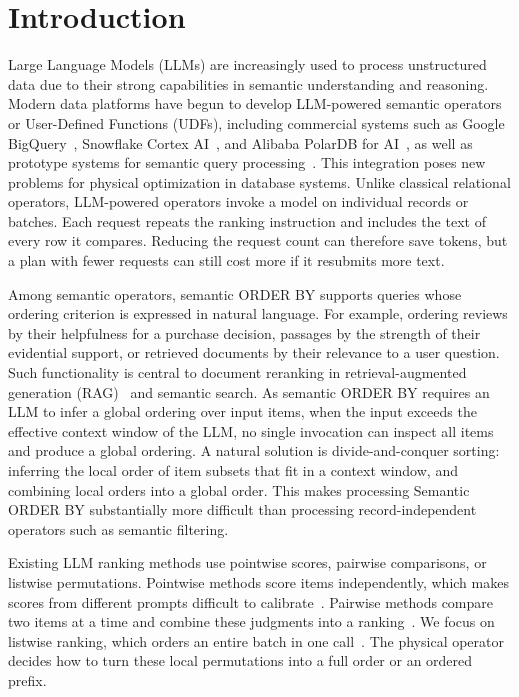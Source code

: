 \section{Introduction}

Large Language Models (LLMs) are increasingly used to process unstructured data due to their strong capabilities in semantic understanding and reasoning.
Modern data platforms have begun to develop LLM-powered semantic operators or User-Defined Functions (UDFs), including commercial systems such as Google BigQuery~\cite{google2026bigqueryai}, Snowflake Cortex AI~\cite{snowflake2026cortexai}, and Alibaba PolarDB for AI~\cite{alibaba2026polardbai}, as well as prototype systems for semantic query processing~\cite{DBLP:journals/pvldb/PatelJPGAGZ25}.
This integration poses new problems for physical optimization in database systems. 
Unlike classical relational operators, LLM-powered operators invoke a model on individual records or batches. Each request repeats the ranking instruction and includes the text of every row it compares. Reducing the request count can therefore save tokens, but a plan with fewer requests can still cost more if it resubmits more text.

Among semantic operators, semantic \textsf{ORDER BY} supports queries whose ordering criterion is expressed in natural language.
For example, ordering reviews by their helpfulness for a purchase decision, passages by the strength of their evidential support, or retrieved documents by their relevance to a user question. 
Such functionality is central to document reranking in retrieval-augmented generation (RAG)~\cite{DBLP:conf/nips/YuP0WYZSC24} and semantic search. As semantic \textsf{ORDER BY} requires an LLM to infer a global ordering over input items, when the input exceeds the effective context window of the LLM, no single invocation can inspect all items and produce a global ordering. 
A natural solution is divide-and-conquer sorting: inferring the local order of item subsets that fit in a context window, and combining local orders into a global order. 
This makes processing Semantic \textsf{ORDER BY} substantially more difficult than processing record-independent operators such as semantic filtering. 


Existing LLM ranking methods use pointwise scores, pairwise comparisons, or listwise permutations. Pointwise methods score items independently, which makes scores from different prompts difficult to calibrate~\cite{DBLP:conf/emnlp/DrozdovZD0RWAIM23,DBLP:conf/emnlp/SachanLJAYPZ22}. Pairwise methods compare two items at a time and combine these judgments into a ranking~\cite{DBLP:conf/acl/LuoCH024,DBLP:conf/naacl/QinJHZWYSLLMWB24}. We focus on listwise ranking, which orders an entire batch in one call~\cite{DBLP:conf/emnlp/0001YMWRCYR23,DBLP:journals/corr/abs-2603-17223,DBLP:journals/corr/abs-2509-00303}. The physical operator decides how to turn these local permutations into a full order or an ordered prefix.

